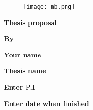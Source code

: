 \begin{titlepage}
    \begin{center}
        \vspace*{1cm}
        
        \begin{figure}[t]
        \centering
        \texttt{[image: mb.png]}
        \end{figure}

        \vspace{2cm}
        
        \Large
        
        \textbf{Thesis proposal}  \hfill
        
        
        
        \Large
        \vspace{1.5cm}
     
        \textbf{By}  \hfill
        
        \textbf{Your name}  \hfill
        
        \LARGE
        
     
        \vspace{3cm}
      
        \textbf{Thesis name}  
        
        
        
        \vspace{3.5cm}
        
        \large
         \textbf{Enter P.I}  \hfill
        
       
        \vspace{0.5cm}
            
       
        \Large
        \textbf{Enter date when finished} \hfill
        
            
    \end{center}
\end{titlepage}
